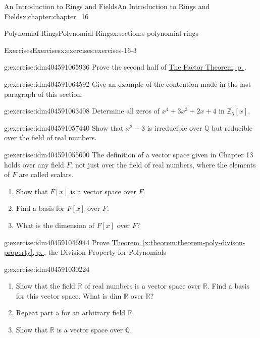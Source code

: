 \documentclass[twoside,10pt,]{book}
\newcommand{\xreffont}{\relax}
\numberwithin{equation}{section}
\begin{document}
\begin{chapterptx}{An Introduction to Rings and Fields}{}{An Introduction to Rings and Fields}{}{}{x:chapter:chapter_16}
\begin{sectionptx}{Polynomial Rings}{}{Polynomial Rings}{}{}{x:section:s-polynomial-rings}
\begin{exercises-subsection}{Exercises}{}{Exercises}{}{}{x:exercises:exercises-16-3}
\begin{divisionexercise}{6}{}{}{g:exercise:idm404591065936}
Prove the second half of \hyperref[x:theorem:theorem-polynomial-factor]{The Factor Theorem, p.\,\pageref{x:theorem:theorem-polynomial-factor}}.%
\end{divisionexercise}%
\begin{divisionexercise}{7}{}{}{g:exercise:idm404591064592}%
Give an example of the contention made in the last paragraph of this section.%
\end{divisionexercise}%
\begin{divisionexercise}{8}{}{}{g:exercise:idm404591063408}%
Determine all zeros of \(x^4+ 3x^3 + 2x + 4\) in \(\mathbb{Z}_5[x]\).%
\end{divisionexercise}%
\begin{divisionexercise}{9}{}{}{g:exercise:idm404591057440}%
Show that \(x^2 - 3\) is irreducible over \(\mathbb{Q}\) but reducible over the field of real numbers.%
\end{divisionexercise}%
\begin{divisionexercise}{10}{}{}{g:exercise:idm404591055600}%
The definition of a vector space given in Chapter 13 holds over any field \(F\), not just over the field of real numbers, where the elements of \(F\) are called scalars.%
\begin{enumerate}[label=(\alph*)]
\item{}Show that \(F[x]\) is a vector space over \(F\).%
\item{}Find a basis for \(F[x]\) over \(F\).%
\item{}What is the dimension of \(F[x]\) over \(F\)?%
\end{enumerate}
%
\end{divisionexercise}%
\begin{divisionexercise}{11}{}{}{g:exercise:idm404591046944}%
Prove \hyperref[x:theorem:theorem-poly-divison-property]{Theorem~{\xreffont\ref{x:theorem:theorem-poly-divison-property}}, p.\,\pageref{x:theorem:theorem-poly-divison-property}}, the Division Property for Polynomials%
\end{divisionexercise}%
\begin{divisionexercise}{12}{}{}{g:exercise:idm404591030224}%
%
\begin{enumerate}[label=(\alph*)]
\item{}Show that the field \(\mathbb{R}\) of real numbers is a vector space over \(\mathbb{R}\). Find a basis for this vector space. What is dim \(\mathbb{R}\) over \(\mathbb{R}\)?%
\item{}Repeat part a for an arbitrary field F.%
\item{}Show that \(\mathbb{R}\) is a vector space over \(\mathbb{Q}\).%

\end{enumerate}
\end{divisionexercise}
\end{exercises-subsection}
\end{sectionptx}
\end{chapterptx}
\end{document}

